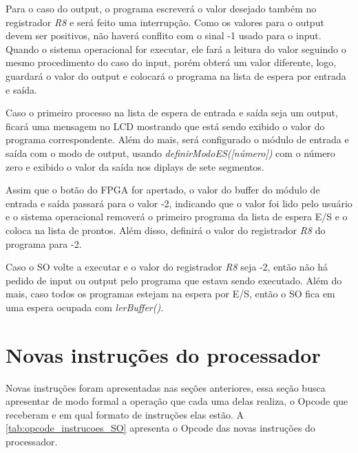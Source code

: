 \documentclass[
	12pt,				%
	oneside,
	a4paper,			%
	english,			%
	french,				%
	spanish,			%
	brazil,				%
	]{abntex2}
\begin{document}
Para o caso do output, o programa escreverá o valor desejado também no registrador \textit{R8} e será feito uma interrupção. Como os valores para o output devem ser positivos, não haverá conflito com o sinal -1 usado para o input. Quando o sistema operacional for executar, ele fará a leitura do valor seguindo o mesmo procedimento do caso do input, porém obterá um valor diferente, logo, guardará o valor do output e colocará o programa na lista de espera por entrada e saída.

Caso o primeiro processo na lista de espera de entrada e saída seja um output, ficará uma mensagem no LCD mostrando que está sendo exibido o valor do programa correspondente. Além do mais, será configurado o módulo de entrada e saída com o modo de output, usando \textit{definirModoES([número])} com o número zero e exibido o valor da saída nos diplays de sete segmentos.

Assim que o botão do FPGA for apertado, o valor do buffer do módulo de entrada e saída passará para o valor -2, indicando que o valor foi lido pelo usuário e o sistema operacional removerá o primeiro programa da lista de espera E/S e o coloca na lista de prontos. Além disso, definirá o valor do registrador \textit{R8} do programa para -2.

Caso o SO volte a executar e o valor do registrador \textit{R8} seja -2, então não há pedido de input ou output pelo programa que estava sendo executado. Além do mais, caso todos os programas estejam na espera por E/S, então o SO fica em uma espera ocupada com \textit{lerBuffer()}.

\section{Novas instruções do processador}
\label{sec:novas_instrucoes_processador}

Novas instruções foram apresentadas nas seções anteriores, essa seção busca apresentar de modo formal a operação que cada uma delas realiza, o Opcode que receberam e em qual formato de instruções elas estão. A \autoref{tab:opcode_instrucoes_SO} apresenta o Opcode das novas instruções do processador.
\end{document}
